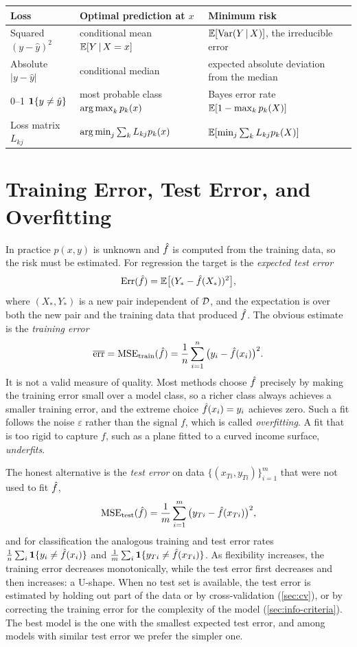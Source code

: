 \begin{center}
\small
\begin{tabularx}{\textwidth}{@{}l>{\raggedright\arraybackslash}X>{\raggedright\arraybackslash}X@{}}
\toprule
Loss & Optimal prediction at $x$ & Minimum risk \\
\midrule
Squared $(y-\hat y)^2$ & conditional mean $\mathbb{E}[Y\,|\, X=x]$ & $\mathbb{E}[\operatorname{Var}(Y\,|\, X)]$, the irreducible error \\
Absolute $\lvert y-\hat y\rvert$ & conditional median & expected absolute deviation from the median \\
0--1 $\mathbf{1}\{y\ne\hat y\}$ & most probable class $\operatorname*{arg\,max}_kp_k(x)$ & Bayes error rate $\mathbb{E}[1-\max_kp_k(X)]$ \\
Loss matrix $L_{kj}$ & $\operatorname*{arg\,min}_j\sum_kL_{kj}p_k(x)$ & $\mathbb{E}[\min_j\sum_kL_{kj}p_k(X)]$ \\
\bottomrule
\end{tabularx}
\end{center}

\section{Training Error, Test Error, and Overfitting}\label{sec:train-test}

In practice $p(x,y)$ is unknown and $\hat f$ is computed from the training data, so the risk must be estimated. For regression the target is the \emph{expected test error}
\[
\operatorname{Err}(\hat f)=\mathbb{E}\big[(Y_*-\hat f(X_*))^2\big],
\]
where $(X_*,Y_*)$ is a new pair independent of $\mathcal{D}$, and the expectation is over both the new pair and the training data that produced $\hat f$. The obvious estimate is the \emph{training error}
\[
\overline{\mathrm{err}}=\operatorname{MSE}_{\text{train}}(\hat f)=\frac1n\sum_{i=1}^n\big(y_i-\hat f(x_i)\big)^2.
\]
It is not a valid measure of quality. Most methods choose $\hat f$ precisely by making the training error small over a model class, so a richer class always achieves a smaller training error, and the extreme choice $\hat f(x_i)=y_i$ achieves zero. Such a fit follows the noise $\varepsilon$ rather than the signal $f$, which is called \emph{overfitting}. A fit that is too rigid to capture $f$, such as a plane fitted to a curved income surface, \emph{underfits}.

The honest alternative is the \emph{test error} on data $\{(x_{Ti},y_{Ti})\}_{i=1}^m$ that were not used to fit $\hat f$,
\[
\operatorname{MSE}_{\text{test}}(\hat f)=\frac1m\sum_{i=1}^m\big(y_{Ti}-\hat f(x_{Ti})\big)^2,
\]
and for classification the analogous training and test error rates $\frac1n\sum_i\mathbf{1}\{y_i\ne\hat f(x_i)\}$ and $\frac1m\sum_i\mathbf{1}\{y_{Ti}\ne\hat f(x_{Ti})\}$. As flexibility increases, the training error decreases monotonically, while the test error first decreases and then increases: a U-shape. When no test set is available, the test error is estimated by holding out part of the data or by cross-validation (\cref{sec:cv}), or by correcting the training error for the complexity of the model (\cref{sec:info-criteria}). The best model is the one with the smallest expected test error, and among models with similar test error we prefer the simpler one.

